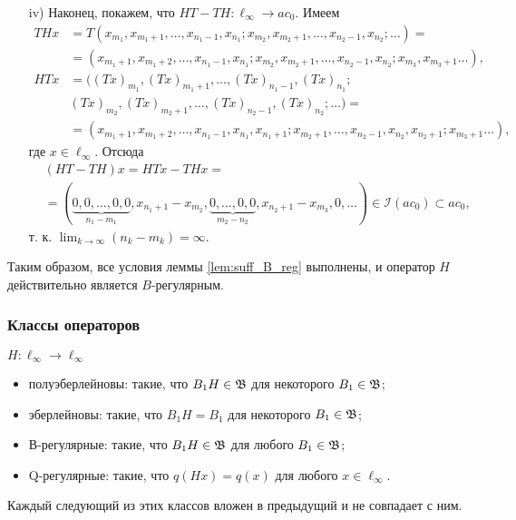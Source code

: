 \begin{frame}
	    \begin{enumerate}
	        \item[iv)] Наконец, покажем, что $HT - TH : \ell_\infty \to ac_0$. Имеем
			\begin{align*}
				THx &= T(x_{m_1}, x_{m_1 + 1}, \ldots, x_{n_1 - 1}, x_{n_1};
				x_{m_2}, x_{m_2 + 1}, \ldots, x_{n_2 - 1}, x_{n_2}; \ldots) = \\
				&= (x_{m_1 + 1}, x_{m_1 + 2}, \ldots, x_{n_1 - 1}, x_{n_1};
				x_{m_2}, x_{m_2 + 1}, \ldots, x_{n_2 - 1}, x_{n_2}; x_{m_3}, x_{m_3 + 1}\ldots), \\
				HTx &= ((Tx)_{m_1}, (Tx)_{m_1 + 1}, \ldots, (Tx)_{n_1 - 1}, (Tx)_{n_1}; \\
				&(Tx)_{m_2}, (Tx)_{m_2 + 1}, \ldots, (Tx)_{n_2 - 1}, (Tx)_{n_2}; \ldots) = \\
				&= (x_{m_1 + 1}, x_{m_1 + 2}, \ldots, x_{n_1 - 1}, x_{n_1}, x_{n_1 + 1}; x_{m_2 + 1},
				\ldots, x_{n_2 - 1}, x_{n_2}, x_{n_2 + 1}; x_{m_3 + 1} \ldots),
			\end{align*}
			где $x \in \ell_\infty$. Отсюда
			\begin{align*}
				&(HT - TH)x = HTx - THx = \\
				&= (\underbrace{0, 0, \ldots, 0, 0}_{n_1 - m_1}, x_{n_1 + 1} - x_{m_2}, \underbrace{0, \ldots,
					0, 0}_{m_2 - n_2}, x_{n_2 + 1} - x_{m_3}, 0, \ldots) \in \mathcal I(ac_0) \subset ac_0,
			\end{align*}
			т. к. $\lim_{k \to \infty} (n_k - m_k) = \infty$.
		\end{enumerate}

		Таким образом, все условия леммы \ref{lem:suff_B_reg} выполнены, и оператор $H$ действительно является $B$-регулярным.

\end{frame}

\begin{frame}\frametitle{{Классы операторов}}
	$H:\ell_\infty \to \ell_\infty$
	\begin{itemize}
		\item
			полуэберлейновы: такие, что $B_1 H \in\mathfrak{B}$ для некоторого $B_1\in \mathfrak{B}$;
		\item
			эберлейновы: такие, что $B_1 H = B_1$ для некоторого $B_1\in \mathfrak{B}$;
		\item
			В-регулярные: такие, что $B_1 H \in \mathfrak{B}$ для любого   $B_1\in \mathfrak{B}$;
		\item
			Q-регулярные: такие, что $q(Hx) = q(x)$ для любого   $x\in \ell_\infty$.
	\end{itemize}
	\begin{ttheorem}
		Каждый следующий из этих классов вложен в предыдущий и не совпадает с ним.
	\end{ttheorem}
\end{frame}


